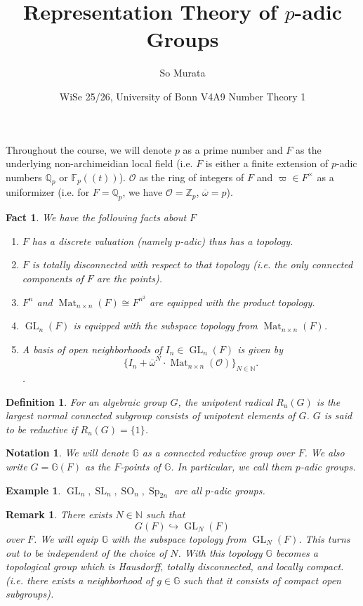 \documentclass[8pt]{article}
\title{Representation Theory of $p$-adic Groups}
\author{So Murata}
\date{WiSe 25/26, University of Bonn V4A9 Number Theory 1}
\newtheorem*{definition*}{Definition}
\newtheorem*{notation*}{Notation}
\newtheorem*{remark*}{Remark}
\newtheorem*{fact*}{Fact}
\newtheorem*{example*}{Example}
\DeclareMathOperator{\GL}{GL}
\DeclareMathOperator{\SL}{SL}
\DeclareMathOperator{\SO}{SO}
\DeclareMathOperator{\Sp}{Sp}
\DeclareMathOperator{\Mat}{Mat}
\newcommand{\N}[0]{\mathbb{N}}
\newcommand{\Z}[0]{\mathbb{Z}}
\newcommand{\Q}[0]{\mathbb{Q}}
\newcommand{\F}[0]{\mathbb{F}}
\newcommand{\G}[0]{\mathbb{G}}
\begin{document}
\maketitle

Throughout the course, we will denote $p$ as a prime number and $F$ as the underlying non-archimeidian local field (i.e. $F$ is either a finite extension of $p$-adic numbers $\Q_p$ or $\F_p((t))$). $\mathcal{O}$ as the ring of integers of $F$ and $\varpi\in F^\times$ as a uniformizer (i.e. for $F=\Q_p$, we have $\mathcal{O}=\Z_p$, $\overline{\omega}=p$). 
\begin{fact*}
We have the following facts about $F$
\begin{enumerate}
\item $F$ has a discrete valuation (namely $p$-adic) thus has a topology.
\item $F$ is totally disconnected with respect to that topology (i.e. the only connected components of $F$ are the points).
\item $F^n$ and $\Mat_{n\times n}(F)\cong F^{n^2}$ are equipped with the product topology.
\item $\GL_n(F)$ is equipped with the subspace topology from $\Mat_{n\times n}(F)$.
\item A basis of open neighborhoods of $I_n\in \GL_n(F)$ is given by 
\begin{equation*}
  \{I_n+ \overline{\omega}^N\cdot\Mat_{n\times n}(\mathcal{O})\}_{N\in\N}.
\end{equation*}.
\end{enumerate}
\end{fact*}

\begin{definition*}
For an algebraic group $G$, the unipotent radical $R_u(G)$ is the largest normal connected subgroup consists of unipotent elements of $G$. $G$ is said to be reductive if $R_u(G)=\{1\}$.
\end{definition*}

\begin{notation*}
We will denote $\G$ as a connected reductive group over $F$. We also write $G=\G(F)$ as the $F$-points of $\G$. In particular, we call them $p$-adic groups.
\end{notation*}

\begin{example*}
$\GL_n,\SL_n,\SO_n,\Sp_{2n}$ are all $p$-adic groups.
\end{example*}

\begin{remark*}
There exists $N\in \N$ such that 
\begin{equation*}
G(F)\hookrightarrow \GL_N(F)
\end{equation*}
over $F$. We will equip $\G$ with the subspace topology from $\GL_N(F)$. This turns out to be independent of the choice of $N$. With this topology $\G$ becomes a topological group which is Hausdorff, totally disconnected, and locally compact. (i.e. there exists a neighborhood of $g\in\G$ such that it consists of compact open subgroups). 
\end{remark*}
\end{document}
